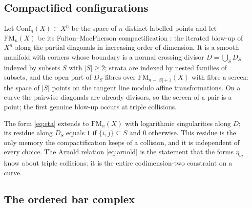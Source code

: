 \documentclass[11pt]{amsart}
\numberwithin{equation}{section}
\theoremstyle{plain}
\theoremstyle{definition}
\theoremstyle{remark}
\newcommand{\FM}{\mathrm{FM}}
\newcommand{\Conf}{\mathrm{Conf}}
\begin{document}
\subsection{Compactified configurations}

Let $\Conf_n(X)\subset X^{n}$ be the space of $n$ distinct labelled points and
let $\FM_n(X)$ be its Fulton--MacPherson compactification \cite{FM}: the
iterated blow-up of $X^{n}$ along the partial diagonals in increasing order of
dimension. It is a smooth manifold with corners whose boundary is a normal
crossing divisor $D=\bigcup_{S}D_S$ indexed by subsets $S$ with $|S|\geq2$;
strata are indexed by nested families of subsets, and the open part of $D_S$
fibres over $\FM_{n-|S|+1}(X)$ with fibre a screen: the space of $|S|$ points
on the tangent line modulo affine transformations. On a curve the pairwise
diagonals are already divisors, so the screen of a pair is a point; the first
genuine blow-up occurs at triple collisions.

The form \eqref{eq:eta} extends to $\FM_n(X)$ with logarithmic singularities
along $D$; its residue along $D_S$ equals $1$ if $\{i,j\}\subseteq S$ and $0$
otherwise. This residue is the only memory the compactification keeps of a
collision, and it is independent of every choice. The Arnold
relation \eqref{eq:arnold} is the statement that the forms $\eta_{ij}$ know
about triple collisions; it is the entire codimension-two constraint on a
curve.

\subsection{The ordered bar complex}
\end{document}
